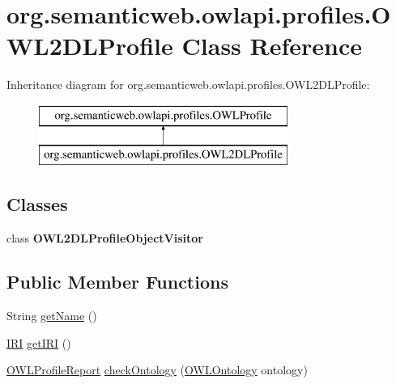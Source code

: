 \hypertarget{classorg_1_1semanticweb_1_1owlapi_1_1profiles_1_1_o_w_l2_d_l_profile}{\section{org.\-semanticweb.\-owlapi.\-profiles.\-O\-W\-L2\-D\-L\-Profile Class Reference}
\label{classorg_1_1semanticweb_1_1owlapi_1_1profiles_1_1_o_w_l2_d_l_profile}
}
Inheritance diagram for org.\-semanticweb.\-owlapi.\-profiles.\-O\-W\-L2\-D\-L\-Profile\-:\begin{figure}[H]
\begin{center}
\leavevmode
\includegraphics[height=2.000000cm]{classorg_1_1semanticweb_1_1owlapi_1_1profiles_1_1_o_w_l2_d_l_profile}
\end{center}
\end{figure}
\subsection*{Classes}
\begin{DoxyCompactItemize}
\item 
class {\bfseries O\-W\-L2\-D\-L\-Profile\-Object\-Visitor}
\end{DoxyCompactItemize}
\subsection*{Public Member Functions}
\begin{DoxyCompactItemize}
\item 
String \hyperlink{classorg_1_1semanticweb_1_1owlapi_1_1profiles_1_1_o_w_l2_d_l_profile_a89155277278251648fa926d4c23c56df}{get\-Name} ()
\item 
\hyperlink{classorg_1_1semanticweb_1_1owlapi_1_1model_1_1_i_r_i}{I\-R\-I} \hyperlink{classorg_1_1semanticweb_1_1owlapi_1_1profiles_1_1_o_w_l2_d_l_profile_ac1f3ca0fd3c0c30e2087cfb9d712f453}{get\-I\-R\-I} ()
\item 
\hyperlink{classorg_1_1semanticweb_1_1owlapi_1_1profiles_1_1_o_w_l_profile_report}{O\-W\-L\-Profile\-Report} \hyperlink{classorg_1_1semanticweb_1_1owlapi_1_1profiles_1_1_o_w_l2_d_l_profile_a866bceb3842b34b9c4c3781844ef31aa}{check\-Ontology} (\hyperlink{interfaceorg_1_1semanticweb_1_1owlapi_1_1model_1_1_o_w_l_ontology}{O\-W\-L\-Ontology} ontology)
\end{DoxyCompactItemize}
